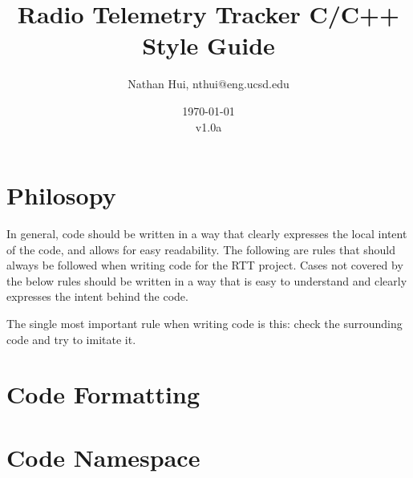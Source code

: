 \documentclass{article}
\title{Radio Telemetry Tracker C/C++ Style Guide}
\author{Nathan Hui, nthui@eng.ucsd.edu}
\date{\today\\v1.0a}
\begin{document}
\maketitle
\section{Philosopy}
In general, code should be written in a way that clearly expresses the local intent of the code, and allows for easy readability.  The following are rules that should always be followed when writing code for the RTT project.  Cases not covered by the below rules should be written in a way that is easy to understand and clearly expresses the intent behind the code.

The single most important rule when writing code is this: check the surrounding code and try to imitate it.
\section{Code Formatting}
\section{Code Namespace}
\end{document}
